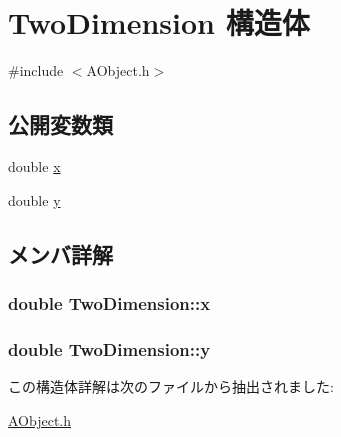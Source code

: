 \hypertarget{struct_two_dimension}{\section{Two\+Dimension 構造体}
\label{struct_two_dimension}
}


{\ttfamily \#include $<$A\+Object.\+h$>$}

\subsection*{公開変数類}
\begin{DoxyCompactItemize}
\item 
double \hyperlink{struct_two_dimension_ac7506c70d1af8d3706ed1f084a1587fb}{x}
\item 
double \hyperlink{struct_two_dimension_aa344dbcbece346bdcb1949249b4c6cfc}{y}
\end{DoxyCompactItemize}


\subsection{メンバ詳解}
\hypertarget{struct_two_dimension_ac7506c70d1af8d3706ed1f084a1587fb}{
\subsubsection[{x}]{\setlength{\rightskip}{0pt plus 5cm}double Two\+Dimension\+::x}}\label{struct_two_dimension_ac7506c70d1af8d3706ed1f084a1587fb}
\hypertarget{struct_two_dimension_aa344dbcbece346bdcb1949249b4c6cfc}{
\subsubsection[{y}]{\setlength{\rightskip}{0pt plus 5cm}double Two\+Dimension\+::y}}\label{struct_two_dimension_aa344dbcbece346bdcb1949249b4c6cfc}


この構造体詳解は次のファイルから抽出されました\+:\begin{DoxyCompactItemize}
\item 
\hyperlink{_a_object_8h}{A\+Object.\+h}\end{DoxyCompactItemize}

